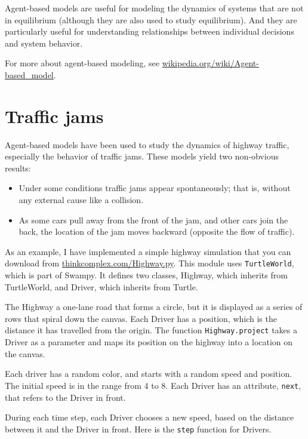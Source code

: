 \documentclass[10pt]{book}
\begin{document}
Agent-based models are useful for modeling the dynamics
of systems that are not in equilibrium (although they are also
used to study equilibrium).  And they are particularly useful for
understanding relationships between individual decisions and
system behavior.

For more about agent-based modeling, see
\url{wikipedia.org/wiki/Agent-based_model}.


\section{Traffic jams}

Agent-based models have been used to study the
dynamics of highway traffic, especially the behavior of traffic
jams.  These models yield two non-obvious
results:

\begin{itemize}

\item Under some conditions traffic jams appear spontaneously;
that is, without any external cause like a collision.

\item As some cars pull away from the front of the
jam, and other cars join the back,  the location of the jam
moves backward (opposite the flow of traffic).

\end{itemize}

As an example, I have implemented a simple highway simulation that you
can download from \url{thinkcomplex.com/Highway.py}.  This
module uses {\tt TurtleWorld}, which is part of Swampy.  It defines
two classes, Highway, which inherits from TurtleWorld, and Driver,
which inherits from Turtle.

The Highway a one-lane road that forms a circle, but it is displayed
as a series of rows that spiral down the canvas.  Each Driver has
a position, which is the distance it has travelled from the origin.
The function {\tt Highway.project} takes a Driver as a parameter
and maps its position on the highway into a location on the
canvas. 

Each driver has a random color, and starts with a random speed and
position.  The initial speed is in the range from 4 to 8.  Each
Driver has an attribute, {\tt next}, that refers to the Driver in
front.

During each time step, each Driver chooses a new speed, based on the
distance between it and the Driver in front.  Here is the {\tt step}
function for Drivers.
\end{document}
